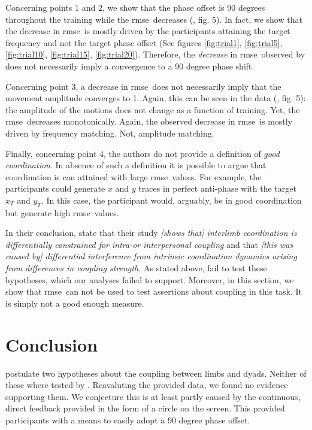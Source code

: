 \documentclass[11pt]{article}
\newcommand{\rmse}{\gls{rmse}}
\newcommand{\myquote}[1]{\textit{#1}}
\newcommand{\fg}[1]{\citet{Annand2020}, fig. #1}
\newcommand{\xt}{x_{T}}
\newcommand{\yt}{y_{T}}
\begin{document}
Concerning points 1 and 2, we show that the phase offset is 90 degrees throughout the training while the \rmse\ decreases (\fg{5}). In fact, we show that the decrease in \rmse\ is mostly driven by the participants attaining the target frequency and not the target phase offset (See figures \ref{fig:trial1}, \ref{fig:trial5}, \ref{fig:trial10}, \ref{fig:trial15}, \ref{fig:trial20}). Therefore, the \textit{decrease} in \rmse\ observed by \citet{Annand2020} does not necessarily imply a convergence to a 90 degree phase shift.

Concerning point 3, a decrease in \rmse\  does not necessarily imply that the movement amplitude converges to 1. Again, this can be seen in the data (\fg{5}): the amplitude of the motions does not change as a function of training. Yet, the \rmse\ decreases monotonically. Again, the  observed decrease in \rmse\ is mostly driven by frequency matching. Not, amplitude matching.

Finally, concerning point 4, the authors do not provide a definition of \textit{good coordination}. In absence of such a definition it is possible to argue that coordination is can attained with large \rmse\ values. For example, the participants could generate $x$ and $y$ traces in perfect anti-phase with the target $\xt$ and $\yt$. In this case, the participant would, arguably, be in good coordination but generate high \rmse\ values.

In their conclusion, \citet{Annand2020} state that their study \myquote{[shows that] interlimb coordination is
 differentially constrained for intra-or interpersonal coupling} and that 
\myquote{[this was caused by] differential interference
from intrinsic coordination dynamics arising from differences in coupling strength.} As stated above, \citet{Annand2020} fail to test these hypotheses, which our analyses failed to support. Moreover, in this section, we show that \rmse\ can not be used to test assertions about coupling in this task. It is simply not a good enough measure. 

\section{Conclusion}

\citet{Annand2020} postulate two hypotheses about the coupling between limbs and dyads. Neither of these where tested by \citet{Annand2020}. Reavaluting the provided data, we found no evidence supporting them. We conjecture this is at least partly caused by the continuous, direct feedback provided in the form of a circle on the screen. This provided  participants with a means to easily adopt a 90 degree phase offset.
\end{document}

